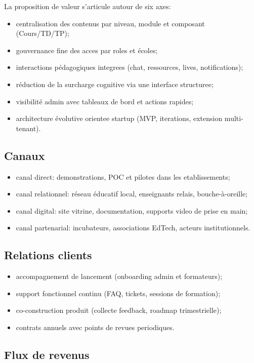 \documentclass[12pt,a4paper,oneside]{report}
\begin{document}
La proposition de valeur s'articule autour de six axes:
\begin{itemize}
  \item centralisation des contenus par niveau, module et composant (Cours/TD/TP);
  \item gouvernance fine des acces par roles et écoles;
  \item interactions pédagogiques integrees (chat, ressources, lives, notifications);
  \item réduction de la surcharge cognitive via une interface structuree;
  \item visibilité admin avec tableaux de bord et actions rapides;
  \item architecture évolutive orientee startup (MVP, iterations, extension multi-tenant).
\end{itemize}

\subsection{Canaux}

\begin{itemize}
  \item canal direct: demonstrations, POC et pilotes dans les etablissements;
  \item canal relationnel: réseau éducatif local, enseignants relais, bouche-à-oreille;
  \item canal digital: site vitrine, documentation, supports video de prise en main;
  \item canal partenarial: incubateurs, associations EdTech, acteurs institutionnels.
\end{itemize}

\subsection{Relations clients}

\begin{itemize}
  \item accompagnement de lancement (onboarding admin et formateurs);
  \item support fonctionnel continu (FAQ, tickets, sessions de formation);
  \item co-construction produit (collecte feedback, roadmap trimestrielle);
  \item contrats annuels avec points de revues periodiques.
\end{itemize}

\subsection{Flux de revenus}
\end{document}
